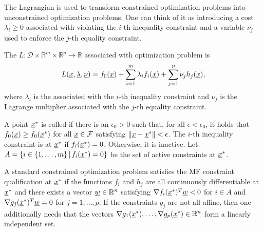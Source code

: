 The Lagrangian is used to transform constrained optimization problems into unconstrained optimization problems.
One can think of it as introducing a cost $\lambda_i \geq 0$ associated with violating the $i$-th inequality constraint and a variable $\nu_j$ used to enforce the $j$-th equality constraint.

\begin{definition} \label{def:lagrangian}
The  $L \colon \mathcal{D} \times \mathbb{R}^m \times \mathbb{R}^p \rightarrow \mathbb{R}$ associated with optimization problem is
\[ L(\underline{x},\underline{\lambda},\underline{\nu}) = f_0(\underline{x}) + \sum_{i=1}^m \lambda_i f_i(\underline{x}) + \sum_{j=1}^p \nu_j h_j(\underline{x}), \]
where $\lambda_i$ is the  associated with the $i$-th inequality constraint and $\nu_j$ is the Lagrange multiplier associated with the $j$-th equality constraint.
\end{definition}

\begin{definition}
A point $\underline{x}^*$ is called  if there is an $\epsilon_0 >0$ such that, for all $\epsilon< \epsilon_0$, it holds that $f_0 (\underline{x}) \geq f_0 (\underline{x}^*)$ for all $\underline{x} \in \mathcal{F}$ satisfying $\| \underline{x} - \underline{x}^* \| < \epsilon$.
The $i$-th inequality constraint is  at $\underline{x}^*$ if $f_i (\underline{x}^*)=0$.
Otherwise, it is inactive.
Let $A = \{ i\in \{1,\ldots,m\} \, | \, f_i (\underline{x}^*)=0 \}$ be the set of active constraints at $\underline{x}^*$.
\end{definition}

\begin{definition}
A standard constrained optimization problem satisfies the MF constraint qualification at $\underline{x}^*$ if the functions $f_i$ and $h_j$ are all continuously differentiable at $\underline{x}^*$ and there exists a vector $\underline{w}\in \mathbb{R}^n$ satisfying $\nabla f_i (\underline{x}^*)^T \underline{w} < 0$ for $i\in A$ and $\nabla g_j (\underline{x}^*)^T \underline{w} = 0$ for $j = 1,\ldots,p$.
If the constraints $g_j$ are not all affine, then one additionally needs that the vectors $\nabla g_1 (\underline{x}^*),\ldots,\nabla g_p (\underline{x}^*) \in \mathbb{R}^n$ form a linearly independent set.
\end{definition}

